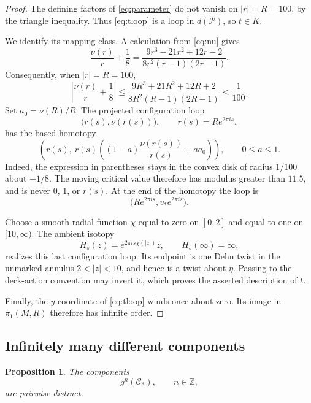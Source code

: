 \documentclass[11pt]{article}
\newcommand{\Z}{\mathbb Z}
\newcommand{\Par}{\mathcal P}
\newtheorem{proposition}[theorem]{Proposition}
\theoremstyle{definition}
\theoremstyle{remark}
\begin{document}
\begin{proof}
The defining factors of \eqref{eq:parameter} do not vanish on
$|r|=R=100$, by the triangle inequality.  Thus \eqref{eq:tloop}
is a loop in $d(\Par)$, so $t\in K$.

We identify its mapping class.  A calculation from \eqref{eq:nu}
gives
\[
\frac{\nu(r)}r+\frac18
=
\frac{9r^3-21r^2+12r-2}
     {8r^2(r-1)(2r-1)}.
\]
Consequently, when $|r|=R=100$,
\begin{equation}\label{eq:estimate}
\left|\frac{\nu(r)}r+\frac18\right|
\le
\frac{9R^3+21R^2+12R+2}
     {8R^2(R-1)(2R-1)}
<\frac1{100}.
\end{equation}
Set $a_0=\nu(R)/R$.
The projected configuration loop
\[
\bigl(r(s),\nu(r(s))\bigr),\qquad r(s)=Re^{2\pi is},
\]
has the based homotopy
\[
\left(
r(s),\
r(s)\left((1-a)\frac{\nu(r(s))}{r(s)}+aa_0\right)
\right),
\qquad 0\le a\le1.
\]
Indeed, the expression in parentheses stays in the convex disk
of radius $1/100$ about $-1/8$.
The moving critical value therefore has modulus greater than
$11.5$, and is never $0$, $1$, or $r(s)$.
At the end of the homotopy the loop is
\[
\bigl(Re^{2\pi is},v_*e^{2\pi is}\bigr).
\]

Choose a smooth radial function $\chi$ equal to zero on $[0,2]$
and equal to one on $[10,\infty)$.
The ambient isotopy
\[
H_s(z)=e^{2\pi is\chi(|z|)}z,\qquad H_s(\infty)=\infty,
\]
realizes this last configuration loop.  Its endpoint is one Dehn
twist in the unmarked annulus $2<|z|<10$, and hence is a twist
about $\eta$.  Passing to the deck-action convention may invert
it, which proves the asserted description of $t$.

Finally, the $y$-coordinate of \eqref{eq:tloop} winds once about zero.
Its image in $\pi_1(M,R)$ therefore has infinite order.
\end{proof}

\subsection{Infinitely many different components}

\begin{proposition}\label{prop:model}
The components
\[
g^n(\mathcal C_*),\qquad n\in\Z,
\]
are pairwise distinct.
\end{proposition}
\end{document}

